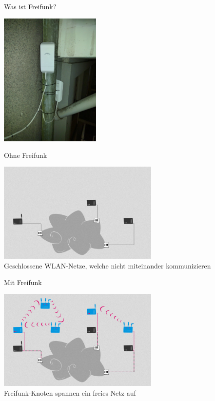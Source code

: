 \documentclass[t]{beamer}
\begin{document}
  \begin{frame}{Was ist Freifunk?}
    \begin{center}
      \includegraphics[width=5cm]{images/irl/wilhelminenstr2}
    \end{center}
  \end{frame}


  \begin{frame}{Ohne Freifunk}
    \begin{center}
      \includegraphics[height=5cm]{images/network_1}\\
      \vspace{1em}
      Geschlossene WLAN-Netze, welche nicht miteinander kommunizieren
      \vspace{1em}
    \end{center}
  \end{frame}

  \begin{frame}{Mit Freifunk}
    \begin{center}
      \includegraphics[height=5cm]{images/network_4}\\
      \vspace{1em}
      Freifunk-Knoten spannen ein freies Netz auf
      \vspace{1em}
    \end{center}
  \end{frame}
\end{document}
